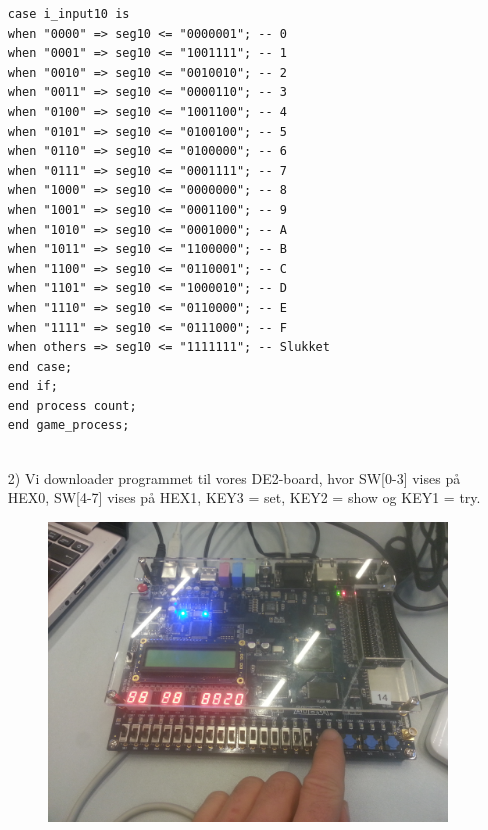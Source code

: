 \begin{enumerate}
\begin{lstlisting}[caption={Behavioral style kode for Guessgame},label={lst:Guessgame}]
case i_input10 is
when "0000" => seg10 <= "0000001"; -- 0
when "0001" => seg10 <= "1001111"; -- 1
when "0010" => seg10 <= "0010010"; -- 2
when "0011" => seg10 <= "0000110"; -- 3
when "0100" => seg10 <= "1001100"; -- 4
when "0101" => seg10 <= "0100100"; -- 5
when "0110" => seg10 <= "0100000"; -- 6
when "0111" => seg10 <= "0001111"; -- 7
when "1000" => seg10 <= "0000000"; -- 8
when "1001" => seg10 <= "0001100"; -- 9
when "1010" => seg10 <= "0001000"; -- A
when "1011" => seg10 <= "1100000"; -- B
when "1100" => seg10 <= "0110001"; -- C
when "1101" => seg10 <= "1000010"; -- D
when "1110" => seg10 <= "0110000"; -- E
when "1111" => seg10 <= "0111000"; -- F
when others => seg10 <= "1111111"; -- Slukket
end case;
end if;
end process count;
end game_process;


	\end{lstlisting}
	\item[2)]
	Vi downloader programmet til vores DE2-board, hvor SW[0-3] vises på HEX0, SW[4-7] vises på HEX1, KEY3 = set, KEY2 = show og KEY1 = try. \\
	\begin{figure}[h]
		\centering
		\includegraphics[scale=0.8]{pictures/Oevelse5/opg3/guess_set.JPG}
		\caption{}
		\label{fig:GuessSet}
	\end{figure}
	\begin{figure}[h]
		\centering

\end{figure}
\end{enumerate}
